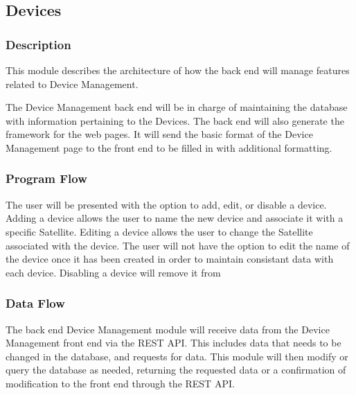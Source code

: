 
\subsection{Devices}

\subsubsection{Description}

This module describes the architecture of how the back end will manage features related to Device Management.

The Device Management back end will be in charge of maintaining the database with information pertaining to the Devices. 
The back end will also generate the framework for the web pages. 
It will send the basic format of the Device Management page to the front end to be filled in with additional formatting.
 

\subsubsection{Program Flow}

The user will be presented with the option to add, edit, or disable a device. 
Adding a device allows the user to name the new device and associate it with a specific Satellite. 
Editing a device allows the user to change the Satellite associated with the device. 
The user will not have the option to edit the name of the device once it has been created in order to maintain consistant data with each device. 
Disabling a device will remove it from 


\subsubsection{Data Flow}

The back end Device Management module will receive data from the Device Management front end via the REST API. 
This includes data that needs to be changed in the database, and requests for data. 
This module will then modify or query the database as needed, 
returning the requested data or a confirmation of modification to the front end through the REST API. 


